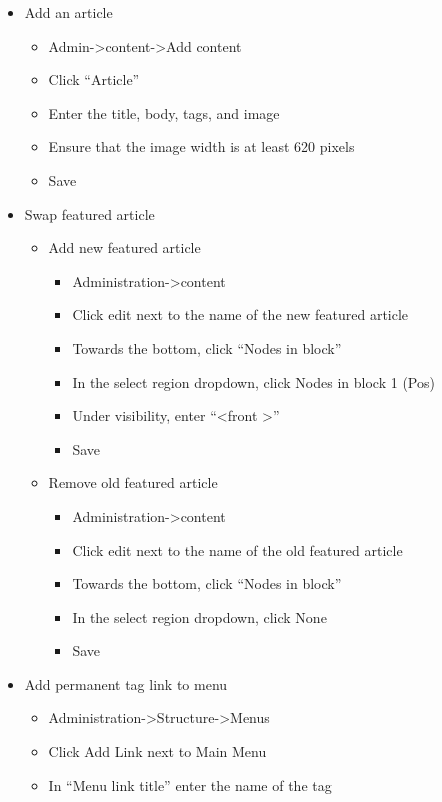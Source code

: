 \documentclass[11pt]{article} %
\begin{document}
\begin{itemize}
\itemindent 0pt
\item Add an article
	\begin{itemize}
	\itemindent 10pt
	\item Admin-\textgreater content-\textgreater Add content
	\item Click “Article”
	\item Enter the title, body, tags, and image
	\item Ensure that the image width is at least 620 pixels
	\item Save
	\end{itemize}
\item Swap featured article
	\begin{itemize}
	\itemindent 10pt
	\item Add new featured article
		\begin{itemize}
		\itemindent 20pt
		\item Administration-\textgreater content
		\item Click edit next to the name of the new featured article
		\item Towards the bottom, click “Nodes in block”
		\item In the select region dropdown, click Nodes in block 1 (Pos)
		\item Under visibility, enter “\textless front \textgreater”
		\item Save
		\end{itemize}
	\item Remove old featured article
		\begin{itemize}
		\itemindent 20pt
		\item Administration-\textgreater content
		\item Click edit next to the name of the old featured article
		\item Towards the bottom, click “Nodes in block”
		\item In the select region dropdown, click None
		\item Save
		\end{itemize}
	\end{itemize}
\item Add permanent tag link to menu
	\begin{itemize}
	\itemindent 10pt
	\item Administration-\textgreater Structure-\textgreater Menus
	\item Click Add Link next to Main Menu
	\item In “Menu link title” enter the name of the tag

\end{itemize}
\end{itemize}
\end{document}
